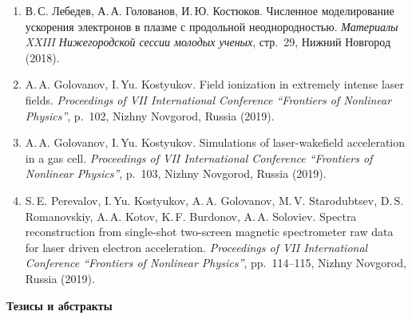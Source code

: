 \documentclass[12pt,a4paper]{scrartcl}
\begin{document}
\begin{enumerate}[parsep=0em, itemsep=0.3em]
\item{ В.\,С. Лебедев, А.\,А. Голованов, И.\,Ю. Костюков. Численное моделирование ускорения электронов в плазме с продольной неоднородностью. \textit{Материалы XXIII Нижегородской сессии молодых ученых}, стр.~29, Нижний Новгород (2018).}
\item{A.\,A. Golovanov, I.\,Yu. Kostyukov. Field ionization in extremely intense laser fields. \textit{Proceedings of VII International Conference “Frontiers of Nonlinear Physics”}, p.~102, Nizhny Novgorod, Russia (2019).}
\item{A.\,A. Golovanov, I.\,Yu. Kostyukov. Simulations of laser-wakefield acceleration in a gas cell. \textit{Proceedings of VII International Conference “Frontiers of Nonlinear Physics”}, p.~103, Nizhny Novgorod, Russia (2019).}
\item{S.\,E. Perevalov, I.\,Yu. Kostyukov, A.\,A. Golovanov, M.\,V. Starodubtsev, D.\,S. Romanovskiy, A.\,A. Kotov, K.\,F. Burdonov, A.\,A. Soloviev. Spectra reconstruction from single-shot two-screen magnetic spectrometer raw data for laser driven electron acceleration. \textit{Proceedings of VII International Conference “Frontiers of Nonlinear Physics”}, pp.~114--115, Nizhny Novgorod, Russia (2019).}
\end{enumerate}

\noindent\textbf{Тезисы и абстракты}
\end{document}
